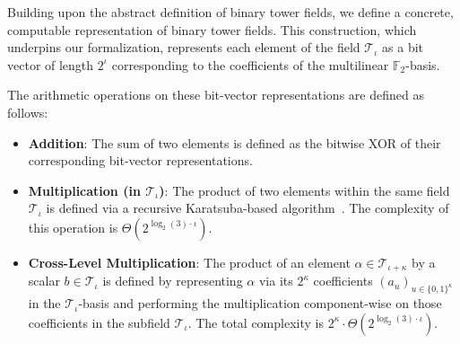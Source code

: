 \begin{definition}
  \label{def:computable_binary_tower_field}
  Building upon the abstract definition of binary tower fields, we define a concrete, computable representation of binary tower fields. This construction, which underpins our formalization, represents each element of the field $\mathcal{T}_\iota$ as a bit vector of length $2^\iota$ corresponding to the coefficients of the multilinear $\mathbb{F}_2$-basis.

  The arithmetic operations on these bit-vector representations are defined as follows:
  \begin{itemize}
      \item \textbf{Addition}: The sum of two elements is defined as the bitwise XOR of their corresponding bit-vector representations.

      \item \textbf{Multiplication (in $\mathcal{T}_\iota$)}: The product of two elements within the same field $\mathcal{T}_\iota$ is defined via a recursive Karatsuba-based algorithm~\cite{FP97}. The complexity of this operation is $\Theta(2^{\log_2(3) \cdot \iota})$.

      \item \textbf{Cross-Level Multiplication}: The product of an element $\alpha \in \mathcal{T}_{\iota+\kappa}$ by a scalar $b \in \mathcal{T}_\iota$ is defined by representing $\alpha$ via its $2^\kappa$ coefficients $(a_u)_{u \in \{0,1\}^\kappa}$ in the $\mathcal{T}_\iota$-basis and performing the multiplication component-wise on those coefficients in the subfield $\mathcal{T}_\iota$. The total complexity is $2^\kappa \cdot \Theta(2^{\log_2(3) \cdot \iota})$.
  \end{itemize}
\end{definition}
